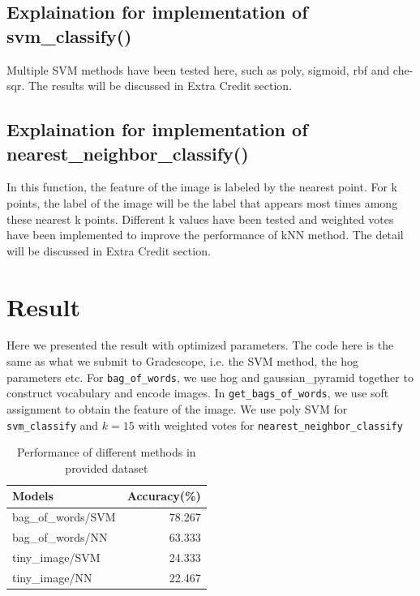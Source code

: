 \subsection*{Explaination for implementation of svm\_classify()}

Multiple SVM methods have been tested here, such as poly, sigmoid, rbf and che-sqr. The results will be discussed in Extra Credit section.

\subsection*{Explaination for implementation of nearest\_neighbor\_classify()}

In this function, the feature of the image is labeled by the nearest point. For k points, the label of the image will be the label that appears most times among these nearest k points. Different k values have been tested and weighted votes have been implemented to improve the performance of kNN method. The detail will be discussed in Extra Credit section.

\section*{Result}

Here we presented the result with optimized parameters. The code here is the same as what we submit to Gradescope, i.e. the SVM method, the hog parameters etc. For \verb|bag_of_words|, we use hog and gaussian\_pyramid together to construct vocabulary and encode images. In \verb|get_bags_of_words|, we use soft assignment to obtain the feature of the image. We use poly SVM for \verb|svm_classify| and $k=15$ with weighted votes for \verb|nearest_neighbor_classify|

\begin{table}[h]
    \centering
    \begin{tabular}{lr}
        \toprule
        Models             & Accuracy(\%) \\
        \midrule
        bag\_of\_words/SVM & 78.267       \\
        bag\_of\_words/NN  & 63.333       \\
        tiny\_image/SVM    & 24.333       \\
        tiny\_image/NN     & 22.467       \\
        \bottomrule
    \end{tabular}
    \caption{Performance of different methods in provided dataset}
    \label{acc}
\end{table}

